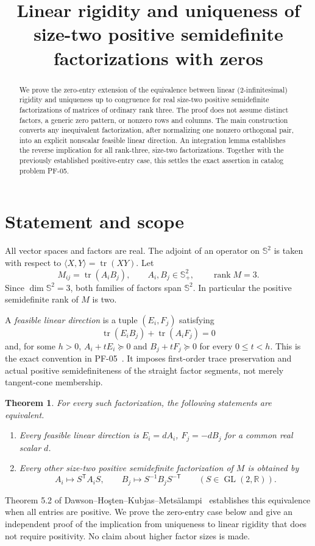 \documentclass[11pt]{article}
\title{Linear rigidity and uniqueness of size-two positive semidefinite factorizations with zeros}
\author{}
\date{}
\newtheorem{theorem}{Theorem}
\newcommand{\Sym}{\mathbb S^2}
\newcommand{\PSD}{\mathbb S^2_+}
\newcommand{\tr}{\operatorname{tr}}
\newcommand{\GL}{\operatorname{GL}}
\newcommand{\rank}{\operatorname{rank}}
\begin{document}
\maketitle
\begin{abstract}
We prove the zero-entry extension of the equivalence between linear (2-infinitesimal) rigidity and uniqueness up to congruence for real size-two positive semidefinite factorizations of matrices of ordinary rank three. The proof does not assume distinct factors, a generic zero pattern, or nonzero rows and columns. The main construction converts any inequivalent factorization, after normalizing one nonzero orthogonal pair, into an explicit nonscalar feasible linear direction. An integration lemma establishes the reverse implication for all rank-three, size-two factorizations. Together with the previously established positive-entry case, this settles the exact assertion in catalog problem PF-05.
\end{abstract}

\section{Statement and scope}
All vector spaces and factors are real. The adjoint of an operator on $\Sym$ is taken with respect to $\langle X,Y\rangle=\tr(XY)$. Let
\[
M_{ij}=\tr(A_iB_j),\qquad A_i,B_j\in\PSD,
\qquad \rank M=3.
\]
Since $\dim\Sym=3$, both families of factors span $\Sym$. In particular the positive semidefinite rank of $M$ is two.

A \emph{feasible linear direction} is a tuple $(E_i,F_j)$ satisfying
\[
\tr(E_iB_j)+\tr(A_iF_j)=0
\]
and, for some $h>0$, $A_i+tE_i\succeq0$ and $B_j+tF_j\succeq0$ for every $0\leq t<h$. This is the exact convention in PF-05~\cite{catalog}. It imposes first-order trace preservation and actual positive semidefiniteness of the straight factor segments, not merely tangent-cone membership.

\begin{theorem}\label{thm:main}
For every such factorization, the following statements are equivalent.
\begin{enumerate}
\item Every feasible linear direction is $E_i=dA_i$, $F_j=-dB_j$ for a common real scalar $d$.
\item Every other size-two positive semidefinite factorization of $M$ is obtained by
\[
 A_i\mapsto S^{\mathsf T}A_iS,
 \qquad B_j\mapsto S^{-1}B_jS^{-\mathsf T}
 \qquad(S\in\GL(2,\mathbb R)).
\]
\end{enumerate}
\end{theorem}
Theorem 5.2 of Dawson--Ho\c{s}ten--Kubjas--Mets\"alampi~\cite{dhkm} establishes this equivalence when all entries are positive. We prove the zero-entry case below and give an independent proof of the implication from uniqueness to linear rigidity that does not require positivity. No claim about higher factor sizes is made.
\end{document}
